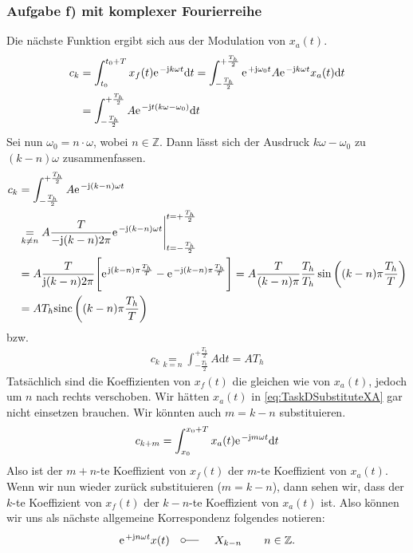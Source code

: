 \documentclass[11pt,a4paper,DIV=12]{scrartcl}
\newcommand{\diff}{\mathrm{d}}
\newcommand{\sinc}{\mathrm{sinc}}
\begin{document}
\subsubsection*{Aufgabe f) mit komplexer Fourierreihe}
%
\label{sec:TaskDComplex}
%
Die nächste Funktion ergibt sich aus der Modulation von $x_{a}(t)$.
%
%
%
\begin{align}
	\label{eq:TaskDSubstituteXA}
	c_k&=\int_{t_0}^{t_0+T}x_{f}(t)\e^{-\im k \omega t}\diff t
	=\int_{-\frac{T_h}{2}}^{+\frac{T_h}{2}}\e^{+\im\omega_0 t}A\e^{-\im k \omega t}x_a(t)\diff t \\
	&=\int_{-\frac{T_h}{2}}^{+\frac{T_h}{2}}A\e^{-\im t(k\omega -\omega_0)}\diff t
\end{align}
%
Sei nun $\omega_0=n\cdot\omega$, wobei $n\in\mathbb{Z}$.
%
Dann lässt sich der Ausdruck $k\omega -\omega_0$ zu $(k-n)\omega$
zusammenfassen.
%
%
\begin{align}
	c_k&=\int_{-\frac{T_h}{2}}^{+\frac{T_h}{2}}A\e^{-\im (k-n)\omega t} \nonumber \\
	&\underset{k\neq n}{=}A\frac{T}{-\im (k-n) 2\pi}\e^{-\im (k-n)\omega t}\Bigg |_{t=-\frac{T_h}{2}}^{t=+\frac{T_h}{2}} \nonumber \\
	&=A\frac{T}{\im (k-n)2 \pi}\Bigg [\e^{\im (k-n)\pi\frac{T_h}{T}}-\e^{-\im (k-n)\pi \frac{T_h}{T}}\Bigg ]
	= A\frac{T}{(k-n)\pi}\frac{T_h}{T_h}\sin\left((k-n)\pi\frac{T_h}{T}\right)\nonumber\\
	&=AT_h\sinc\left((k-n)\pi\frac{T_h}{T}\right)
\end{align}
%
bzw.
%
\begin{align}
	c_k\underset{k=n}{=}\int_{-\frac{T_h}{2}}^{+\frac{T_h}{2}}A\diff t=AT_h
\end{align}
%
Tatsächlich sind die Koeffizienten von $x_{f}(t)$ die gleichen wie von
$x_{a}(t)$, jedoch um $n$ nach rechts verschoben.
%
Wir hätten $x_{a}(t)$ in \eqref{eq:TaskDSubstituteXA} gar nicht einsetzen brauchen.
%
Wir könnten auch $m=k-n$ substituieren.
%
\begin{align}
	c_{k+m}=\int_{x_0}^{x_0+T}x_{a}(t)\e^{-\im m \omega t}\diff t
\end{align}
Also ist der $m+n$-te Koeffizient von $x_{f}(t)$ der $m$-te Koeffizient von
$x_{a}(t)$.
%
Wenn wir nun wieder zurück substituieren ($m=k-n$), dann sehen wir, dass der $k$-te Koeffizient von $x_{f}(t)$ der $k-n$-te Koeffizient von $x_{a}(t)$ ist.
%
Also können wir uns als nächste allgemeine Korrespondenz folgendes notieren:
%
%
\begin{align}
	\label{eq:CorrespondenceModulation}
	\e^{+\im n \omega t}x(t)\quad\fourier\quad X_{k-n}\quad\quad n\in\mathbb{Z}.
\end{align}
\end{document}
